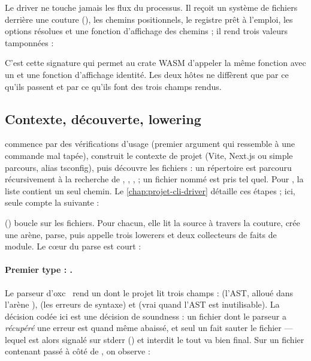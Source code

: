 
Le driver ne touche jamais les flux du processus. Il reçoit un système de fichiers derrière une couture (), les chemins positionnels, le registre prêt à l'emploi, les options résolues et une fonction d'affichage des chemins ; il rend trois valeurs tamponnées :



C'est cette signature qui permet au crate WASM d'appeler la même fonction avec un  et une fonction d'affichage identité. Les deux hôtes ne diffèrent que par ce qu'ils passent et par ce qu'ils font des trois champs rendus.

\subsection{Contexte, découverte, lowering}

 commence par des vérifications d'usage (premier argument qui ressemble à une commande mal tapée), construit le contexte de projet (Vite, Next.js ou simple parcours, alias tsconfig), puis découvre les fichiers : un répertoire est parcouru récursivement à la recherche de , , ,  ; un fichier nommé est pris tel quel. Pour , la liste contient un seul chemin. Le \cref{chap:projet-cli-driver} détaille ces étapes ; ici, seule compte la suivante :


 () boucle sur les fichiers. Pour chacun, elle lit la source à travers la couture, crée une arène, parse, puis appelle trois lowerers et deux collecteurs de faits de module. Le cœur du parse est court :


\paragraph{Premier type : .} Le parseur d'oxc~\cite{oxc} rend un  dont le projet lit trois champs :  (l'AST, alloué dans l'arène ),  (les erreurs de syntaxe) et  (vrai quand l'AST est inutilisable). La décision codée ici est une décision de soundness : un fichier dont le parseur a \emph{récupéré} une erreur est quand même abaissé, et seul un  fait sauter le fichier --- lequel est alors signalé sur stderr (\code{[skipped]}) et interdit le \og tout va bien\fg{} final. Sur un fichier contenant  passé à côté de , on observe :

